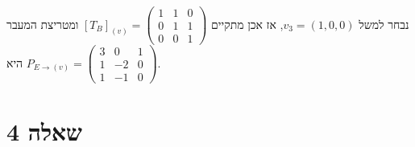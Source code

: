 \documentclass{article}
\begin{document}
נבחר למשל $v_3=(1,0,0)$, אז אכן מתקיים $[T_B]_{(v)}=\begin{pmatrix}
        1 & 1 & 0 \\
        0 & 1 & 1 \\
        0 & 0 & 1
    \end{pmatrix}$ ומטריצת המעבר היא $P_{E\rightarrow (v)}=\begin{pmatrix}
        3 & 0  & 1 \\
        1 & -2 & 0 \\
        1 & -1 & 0
    \end{pmatrix}$.


\pagebreak

\section*{שאלה 4}
\end{document}
